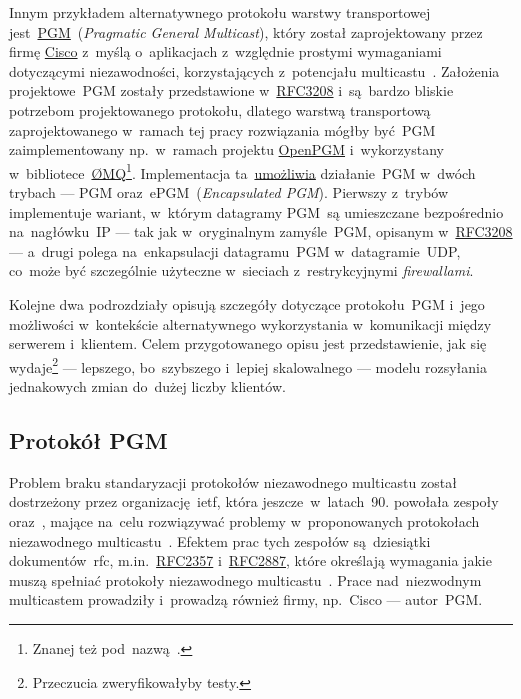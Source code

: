 \documentclass[thesis]{subfiles}
\begin{document}
Innym przykładem alternatywnego protokołu warstwy transportowej jest~\href{https://en.wikipedia.org/wiki/Pragmatic_General_Multicast}{PGM}~(\emph{Pragmatic General Multicast}), który został zaprojektowany przez firmę \href{http://www.cisco.com/}{Cisco} z~myślą o~aplikacjach z~względnie prostymi wymaganiami dotyczącymi niezawodności, korzystających z~potencjału multicastu~\cite{pgm-rfc}. Założenia projektowe~PGM zostały przedstawione w~\href{https://tools.ietf.org/html/rfc3208}{RFC3208} i~są~bardzo bliskie potrzebom projektowanego protokołu, dlatego warstwą transportową zaprojektowanego w~ramach tej pracy rozwiązania mógłby być~PGM zaimplementowany np.~w~ramach projektu \href{https://code.google.com/archive/p/openpgm/}{OpenPGM} i~wykorzystany w~bibliotece~\href{http://zeromq.org/}{ØMQ}\footnote{Znanej też pod~nazwą~.}. Implementacja ta~\href{http://api.zeromq.org/2-1:zmq-pgm}{umożliwia} działanie~PGM w~dwóch trybach --- PGM oraz~ePGM~(\emph{Encapsulated PGM}). Pierwszy z~trybów implementuje wariant, w~którym datagramy PGM~są umieszczane bezpośrednio na~nagłówku~IP --- tak jak w~oryginalnym zamyśle~PGM, opisanym w~\href{https://tools.ietf.org/html/rfc3208}{RFC3208} --- a~drugi polega na~enkapsulacji datagramu~PGM w~datagramie~UDP, co~może być szczególnie użyteczne w~sieciach z~restrykcyjnymi \emph{firewallami}.

Kolejne dwa podrozdziały opisują szczegóły dotyczące protokołu~PGM i~jego możliwości w~kontekście alternatywnego wykorzystania w~komunikacji między serwerem i~klientem. Celem przygotowanego opisu jest przedstawienie, jak się wydaje\footnote{Przeczucia zweryfikowałyby testy.} --- lepszego, bo~szybszego i~lepiej skalowalnego --- modelu rozsyłania jednakowych zmian do~dużej liczby klientów.


\subsection{Protokół PGM}
\label{subsec:pgm}

Problem braku standaryzacji protokołów niezawodnego multicastu został dostrzeżony przez organizację~\gls{ietf}, która jeszcze~w~latach~90. powołała zespoły  oraz~, mające na~celu rozwiązywać problemy w~proponowanych protokołach niezawodnego multicastu~\cite{reliable-multicast-journal,reliable-multicast-transport}. Efektem prac tych zespołów są~dziesiątki dokumentów~\gls{rfc}, m.in.~\href{https://tools.ietf.org/html/rfc2357.html}{RFC2357} i~\href{https://tools.ietf.org/html/rfc2887}{RFC2887}, które określają wymagania jakie muszą spełniać protokoły niezawodnego multicastu~\cite{rfc2887,rfc2357}. Prace nad~niezwodnym multicastem prowadziły i~prowadzą również firmy, np.~Cisco --- autor~PGM.
\end{document}
